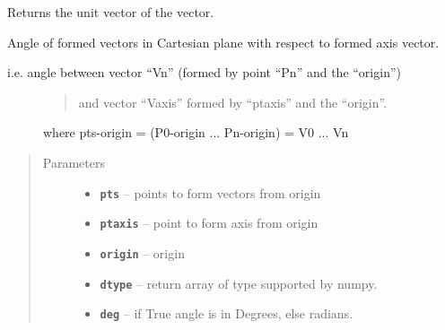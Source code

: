 \documentclass[letterpaper,10pt,english]{sphinxmanual}
\begin{document}

\begin{fulllineitems}
\label{RRtoolbox.lib.arrayops:RRtoolbox.lib.arrayops.basic.unit_vector}
Returns the unit vector of the vector.

\end{fulllineitems}


\begin{fulllineitems}
\label{RRtoolbox.lib.arrayops:RRtoolbox.lib.arrayops.basic.vectorsAngles}
Angle of formed vectors in Cartesian plane with respect to formed axis vector.
\begin{description}
\item[{i.e. angle between vector ``Vn'' (formed by point ``Pn'' and the ``origin'')}] \leavevmode\begin{quote}

and vector ``Vaxis'' formed by ``ptaxis'' and the ``origin''.
\end{quote}

where pts-origin = (P0-origin ... Pn-origin) = V0 ... Vn

\end{description}
\begin{quote}\begin{description}
\item[{Parameters}] \leavevmode\begin{itemize}
\item {} 
\textbf{\texttt{pts}} -- points to form vectors from origin

\item {} 
\textbf{\texttt{ptaxis}} -- point to form axis from origin

\item {} 
\textbf{\texttt{origin}} -- origin

\item {} 
\textbf{\texttt{dtype}} -- return array of type supported by numpy.

\item {} 
\textbf{\texttt{deg}} -- if True angle is in Degrees, else radians.


\end{itemize}
\end{description}
\end{quote}
\end{fulllineitems}
\end{document}
